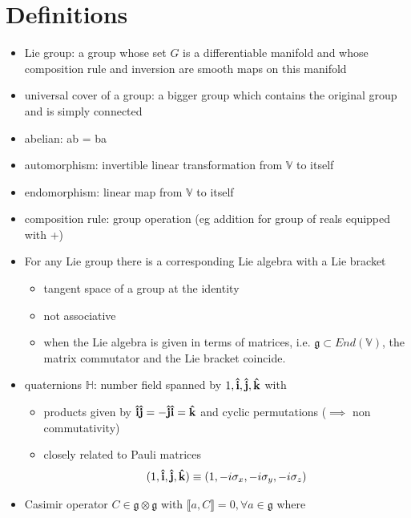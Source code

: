 \documentclass[11pt]{article}
\begin{document}
\section{Definitions}
\begin{itemize}
    \item Lie group: a group whose set $G$ is a differentiable manifold and whose composition rule and inversion are smooth maps on this manifold 
    \item universal cover of a group: a bigger group which contains the original group and is simply connected
    \item abelian: ab = ba
    \item automorphism: invertible linear transformation from $\mathbb{V}$ to itself 
    \item endomorphism: linear map from $\mathbb{V}$ to itself 
    \item composition rule: group operation (eg addition for group of reals equipped with +)
    \item For any Lie group there is a corresponding Lie algebra with a Lie bracket
        \begin{itemize}
            \item tangent space of a group at the identity 
            \item not associative 
            \item when the Lie algebra is given in terms of matrices, i.e. $\mathfrak{g} \subset End(\mathbb{V})$, the matrix commutator and the Lie bracket coincide. 
        \end{itemize}
    \item quaternions $\mathbb{H}$: number field spanned by $1, \vu{i}, \vu{j}, \vu{k}$ with 
        \begin{itemize}
            \item products given by $\vu{i} \vu{j} = - \vu{j} \vu{i} = \vu{k}$ and cyclic permutations ($\implies$ non commutativity)
            \item closely related to Pauli matrices 
            \begin{align*}
                (1, \vu{i}, \vu{j}, \vu{k}) \equiv (1, -i\sigma_x, -i\sigma_y, -i\sigma_z)
            \end{align*}
        \end{itemize}
    \item Casimir operator $C \in \mathfrak{g} \otimes \mathfrak{g}$ with $\llbracket a, C \rrbracket = 0, \forall a \in \mathfrak{g}$ where 
    \begin{align*}

\end{align*}
\end{itemize}
\end{document}
